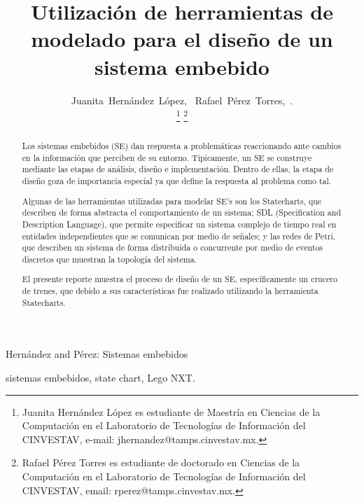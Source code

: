 \documentclass[journal]{IEEEtran}
\begin{document}
\title{Utilización de herramientas de modelado para el diseño de un sistema embebido}

\author{Juanita~Hernández~López,~
        Rafael~Pérez~Torres,~.

	\thanks{Juanita Hernández López es estudiante de Maestría en Ciencias de la Computación en el Laboratorio de Tecnologías de Información del CINVESTAV, e-mail: jhernandez@tamps.cinvestav.mx.}
	\thanks{Rafael Pérez Torres es estudiante de doctorado en Ciencias de la Computación en el Laboratorio de Tecnologías de Información del CINVESTAV, email: rperez@tamps.cinvestav.mx.}
}

%
{Hernández and Pérez: Sistemas embebidos}

\maketitle

\begin{abstract}
Los sistemas embebidos (SE) dan respuesta a problemáticas reaccionando ante cambios en la información que perciben de su entorno.
Típicamente, un SE se construye mediante las etapas de análisis, diseño e implementación.
Dentro de ellas, la etapa de diseño goza de importancia especial ya que define la respuesta al problema como tal. 

Algunas de las herramientas utilizadas para modelar SE’s son los Statecharts, que describen de forma abstracta el comportamiento de un sistema; SDL (Specification and Description Language), que permite especificar un sistema complejo de tiempo real en entidades independientes que se comunican por medio de señales; y las redes de Petri, que describen un sistema de forma distribuida o concurrente por medio de eventos discretos que muestran la topología del sistema.

El presente reporte muestra el proceso de diseño de un SE, específicamente un crucero de trenes, que debido a sus características fue realizado utilizando la herramienta Statecharts.


\end{abstract}

\begin{IEEEkeywords}
sistemas embebidos, state chart, Lego NXT.
\end{IEEEkeywords}
\end{document}
